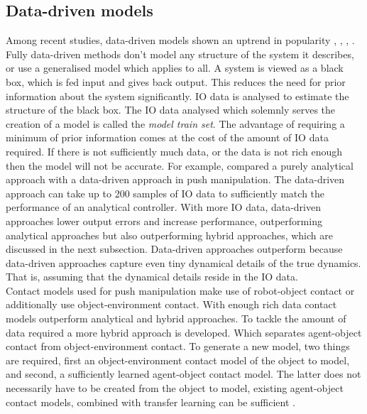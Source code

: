 \subsection{Data-driven models}
\label{subsection: data_driven_models}
Among recent studies, data-driven models shown an uptrend in popularity \cite{mericli_pushmanipulation_2015},
\cite{bauza_data-efficient_2018},  \cite{stuber_featurebased_2018}, \cite{stuber_lets_2020}. Fully data-driven methods don't model any structure of the system it describes, or use a generalised model which applies to all. A system is viewed as a black box, which is fed input and gives back output. This reduces the need for prior information about the system significantly. \ac{IO} data is analysed to estimate the structure of the black box. The \ac{IO} data analysed which solemnly serves the creation of a model is called the \textit{model train set}. The advantage of requiring a minimum of prior information comes at the cost of the amount of \ac{IO} data required. If there is not sufficiently much data, or the data is not rich enough then the model will not be accurate. For example, \cite{bauza_dataefficient_2018} compared a purely analytical approach with a data-driven approach in push manipulation. The data-driven approach can take up to 200 samples of \ac{IO} data to sufficiently match the performance of an analytical controller. With more \ac{IO} data, data-driven approaches lower output errors and increase performance, outperforming analytical approaches but also outperforming hybrid approaches, which are discussed in the next subsection. Data-driven approaches outperform because data-driven approaches capture even tiny dynamical details of the true dynamics. That is, assuming that the dynamical details reside in the \ac{IO} data. \\

Contact models used for push manipulation make use of robot-object contact or additionally use object-environment contact. With enough rich data contact models outperform analytical and hybrid approaches. To tackle the amount of data required a more hybrid approach is developed. Which separates agent-object contact from object-environment contact. To generate a new model, two things are required, first an object-environment contact model of the object to model, and second, a sufficiently learned agent-object contact model. The latter does not necessarily have to be created from the object to model, existing agent-object contact models, combined with transfer learning can be sufficient \cite{kopicki_learning_2017}. \\

